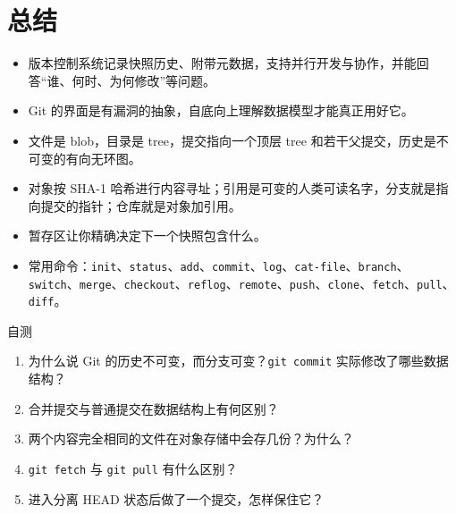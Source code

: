 \documentclass[a4paper]{article}
\begin{document}
\section{总结}

\begin{itemize}
\item 版本控制系统记录快照历史、附带元数据，支持并行开发与协作，并能回答“谁、何时、为何修改”等问题。
\item Git 的界面是有漏洞的抽象，自底向上理解数据模型才能真正用好它。
\item 文件是 blob，目录是 tree，提交指向一个顶层 tree 和若干父提交，历史是不可变的有向无环图。
\item 对象按 SHA-1 哈希进行内容寻址；引用是可变的人类可读名字，分支就是指向提交的指针；仓库就是对象加引用。
\item 暂存区让你精确决定下一个快照包含什么。
\item 常用命令：\texttt{init}、\texttt{status}、\texttt{add}、\texttt{commit}、\texttt{log}、\texttt{cat-file}、\texttt{branch}、\texttt{switch}、\texttt{merge}、\texttt{checkout}、\texttt{reflog}、\texttt{remote}、\texttt{push}、\texttt{clone}、\texttt{fetch}、\texttt{pull}、\texttt{diff}。
\end{itemize}

\begin{practicebox}{自测}
\begin{enumerate}
\item 为什么说 Git 的历史不可变，而分支可变？\texttt{git commit} 实际修改了哪些数据结构？
\item 合并提交与普通提交在数据结构上有何区别？
\item 两个内容完全相同的文件在对象存储中会存几份？为什么？
\item \texttt{git fetch} 与 \texttt{git pull} 有什么区别？
\item 进入分离 HEAD 状态后做了一个提交，怎样保住它？
\end{enumerate}
\end{practicebox}
\end{document}

